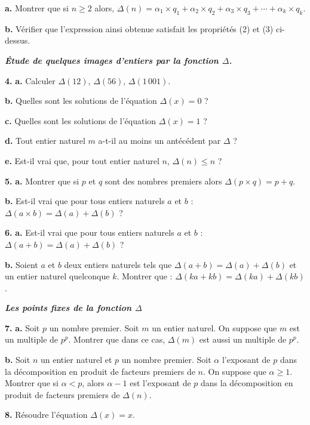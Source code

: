 \textbf{a.} Montrer que si $n \geqslant 2$ alors,
$\Delta(n) = \alpha_1 \times q_1 + \alpha_2 \times q_2 + \alpha_3 \times q_3 + \cdots + \alpha_k \times q_k$.

\textbf{b.} Vérifier que l'expression ainsi obtenue satisfait les propriétés (2) et (3) ci-dessus.

\textbf{\emph{Étude de quelques images d'entiers par la fonction $\Delta$.}}

\textbf{4.} \textbf{a.} Calculer $\Delta(12)$, $\Delta(56)$, $\Delta(1\,001)$.

\textbf{b.} Quelles sont les solutions de l'équation $\Delta(x) = 0$ ?

\textbf{c.} Quelles sont les solutions de l'équation $\Delta(x) = 1$ ?

\textbf{d.} Tout entier naturel $m$ a-t-il au moins un antécédent par $\Delta$ ?

\textbf{e.} Est-il vrai que, pour tout entier naturel $n$, $\Delta(n) \leqslant n$ ?

\textbf{5.} \textbf{a.} Montrer que si $p$ et $q$ sont des nombres premiers alors $\Delta(p \times q) = p + q$.

\textbf{b.} Est-il vrai que pour tous entiers naturels $a$ et $b$ : $\Delta(a \times b) = \Delta(a) + \Delta(b)$ ?

\textbf{6.} \textbf{a.} Est-il vrai que pour tous entiers naturels $a$ et $b$ : $\Delta(a + b) = \Delta(a) + \Delta(b)$ ?

\textbf{b.} Soient $a$ et $b$ deux entiers naturels tels que $\Delta(a + b) = \Delta(a) + \Delta(b)$ et un entier naturel quelconque $k$.
Montrer que : $\Delta(ka + kb) = \Delta(ka) + \Delta(kb)$.

\textbf{\emph{Les points fixes de la fonction $\Delta$}}

\textbf{7.} \textbf{a.} Soit $p$ un nombre premier. Soit $m$ un entier naturel. On suppose que $m$ est un multiple de $p^p$. Montrer que
dans ce cas, $\Delta(m)$ est aussi un multiple de $p^p$.

\textbf{b.} Soit $n$ un entier naturel et $p$ un nombre premier. Soit $\alpha$ l'exposant de $p$ dans la décomposition en produit de
facteurs premiers de $n$. On suppose que $\alpha \geqslant 1$. Montrer que si $\alpha < p$, alors $\alpha - 1$ est l'exposant de $p$ dans la
décomposition en produit de facteurs premiers de $\Delta(n)$.

\textbf{8.} Résoudre l'équation $\Delta(x) = x$.
